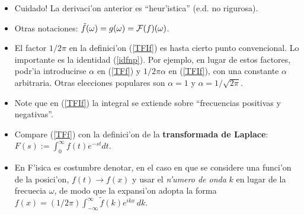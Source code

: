 \begin{itemize}
\item Cuidado! La derivaci'on anterior es ``heur'istica'' (e.d. no rigurosa). 
\item Otras notaciones: $\tilde{f}(\omega)=g(\omega)={\cal F}(f)(\omega)$.
\item El factor $1/2\pi$ en la definici'on (\ref{TFIf}) es hasta cierto punto convencional. Lo importante es la identidad (\ref{idfnp}). Por ejemplo, en lugar de estos factores, podr'ia introducirse $\alpha$ en (\ref{TFf}) y $1/2\pi\alpha$ en (\ref{TFIf}), con una constante $\alpha$ arbitraria. Otras elecciones populares son $\alpha=1$ y $\alpha=1/\sqrt{2\pi}$.
\item Note que en (\ref{TFIf}) la integral se extiende sobre ``frecuencias positivas y negativas''.
\item Compare (\ref{TFf}) con la definici'on de la \textbf{transformada de Laplace}: $F(s):=\int_0^\infty f(t)e^{-st}dt$.
\item En F'isica es costumbre denotar, en el caso en que se considere una funci'on de la posici'on, $f(t)\to f(x)$ y usar el \textit{n'umero de onda} $k$ en lugar de la frecuecia $\omega$, de modo que la expansi'on adopta la forma $f(x)=(1/{2\pi})\int_{-\infty}^\infty\tilde{f}(k) e^{ikx} \,dk.$
\end{itemize}

